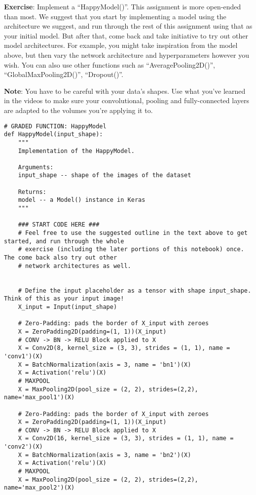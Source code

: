 {\textbf {Exercise}}: Implement a ``HappyModel()''. This assignment is more open-ended than most. We suggest that you start by implementing a model using the architecture we suggest, and run through the rest of this assignment using that as your initial model. But after that, come back and take initiative to try out other model architectures. For example, you might take inspiration from the model above, but then vary the network architecture and hyperparameters however you wish. You can also use other functions such as ``AveragePooling2D()'', ``GlobalMaxPooling2D()'', ``Dropout()''. 

{\textbf {Note}}: You have to be careful with your data's shapes. Use what you've learned in the videos to make sure your convolutional, pooling and fully-connected layers are adapted to the volumes you're applying it to.
\begin{verbatim}
# GRADED FUNCTION: HappyModel
def HappyModel(input_shape):
    """
    Implementation of the HappyModel.
    
    Arguments:
    input_shape -- shape of the images of the dataset

    Returns:
    model -- a Model() instance in Keras
    """
    
    ### START CODE HERE ###
    # Feel free to use the suggested outline in the text above to get started, and run through the whole
    # exercise (including the later portions of this notebook) once. The come back also try out other
    # network architectures as well. 
    
    
    # Define the input placeholder as a tensor with shape input_shape. Think of this as your input image!
    X_input = Input(input_shape)
    
    # Zero-Padding: pads the border of X_input with zeroes
    X = ZeroPadding2D(padding=(1, 1))(X_input)
    # CONV -> BN -> RELU Block applied to X
    X = Conv2D(8, kernel_size = (3, 3), strides = (1, 1), name = 'conv1')(X)
    X = BatchNormalization(axis = 3, name = 'bn1')(X)
    X = Activation('relu')(X)
    # MAXPOOL
    X = MaxPooling2D(pool_size = (2, 2), strides=(2,2), name='max_pool1')(X)
    
    # Zero-Padding: pads the border of X_input with zeroes
    X = ZeroPadding2D(padding=(1, 1))(X_input)
    # CONV -> BN -> RELU Block applied to X
    X = Conv2D(16, kernel_size = (3, 3), strides = (1, 1), name = 'conv2')(X)
    X = BatchNormalization(axis = 3, name = 'bn2')(X)
    X = Activation('relu')(X)
    # MAXPOOL
    X = MaxPooling2D(pool_size = (2, 2), strides=(2,2), name='max_pool2')(X)
    

\end{verbatim}

